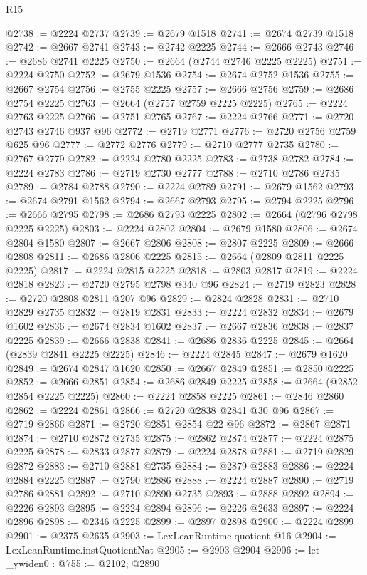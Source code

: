 \begin{lexlean}{R15}
\begin{coremodule}
@2738 := @2224 @2737
@2739 := @2679 @1518
@2741 := @2674 @2739 @1518
@2742 := @2667 @2741
@2743 := @2742 @2225
@2744 := @2666 @2743
@2746 := @2686 @2741 @2225
@2750 := @2664 (@2744 @2746 @2225 @2225)
@2751 := @2224 @2750
@2752 := @2679 @1536
@2754 := @2674 @2752 @1536
@2755 := @2667 @2754
@2756 := @2755 @2225
@2757 := @2666 @2756
@2759 := @2686 @2754 @2225
@2763 := @2664 (@2757 @2759 @2225 @2225)
@2765 := @2224 @2763 @2225
@2766 := @2751 @2765
@2767 := @2224 @2766
@2771 := @2720 @2743 @2746 @937 @96
@2772 := @2719 @2771
@2776 := @2720 @2756 @2759 @625 @96
@2777 := @2772 @2776
@2779 := @2710 @2777 @2735
@2780 := @2767 @2779
@2782 := @2224 @2780 @2225
@2783 := @2738 @2782
@2784 := @2224 @2783
@2786 := @2719 @2730 @2777
@2788 := @2710 @2786 @2735
@2789 := @2784 @2788
@2790 := @2224 @2789
@2791 := @2679 @1562
@2793 := @2674 @2791 @1562
@2794 := @2667 @2793
@2795 := @2794 @2225
@2796 := @2666 @2795
@2798 := @2686 @2793 @2225
@2802 := @2664 (@2796 @2798 @2225 @2225)
@2803 := @2224 @2802
@2804 := @2679 @1580
@2806 := @2674 @2804 @1580
@2807 := @2667 @2806
@2808 := @2807 @2225
@2809 := @2666 @2808
@2811 := @2686 @2806 @2225
@2815 := @2664 (@2809 @2811 @2225 @2225)
@2817 := @2224 @2815 @2225
@2818 := @2803 @2817
@2819 := @2224 @2818
@2823 := @2720 @2795 @2798 @340 @96
@2824 := @2719 @2823
@2828 := @2720 @2808 @2811 @207 @96
@2829 := @2824 @2828
@2831 := @2710 @2829 @2735
@2832 := @2819 @2831
@2833 := @2224 @2832
@2834 := @2679 @1602
@2836 := @2674 @2834 @1602
@2837 := @2667 @2836
@2838 := @2837 @2225
@2839 := @2666 @2838
@2841 := @2686 @2836 @2225
@2845 := @2664 (@2839 @2841 @2225 @2225)
@2846 := @2224 @2845
@2847 := @2679 @1620
@2849 := @2674 @2847 @1620
@2850 := @2667 @2849
@2851 := @2850 @2225
@2852 := @2666 @2851
@2854 := @2686 @2849 @2225
@2858 := @2664 (@2852 @2854 @2225 @2225)
@2860 := @2224 @2858 @2225
@2861 := @2846 @2860
@2862 := @2224 @2861
@2866 := @2720 @2838 @2841 @30 @96
@2867 := @2719 @2866
@2871 := @2720 @2851 @2854 @22 @96
@2872 := @2867 @2871
@2874 := @2710 @2872 @2735
@2875 := @2862 @2874
@2877 := @2224 @2875 @2225
@2878 := @2833 @2877
@2879 := @2224 @2878
@2881 := @2719 @2829 @2872
@2883 := @2710 @2881 @2735
@2884 := @2879 @2883
@2886 := @2224 @2884 @2225
@2887 := @2790 @2886
@2888 := @2224 @2887
@2890 := @2719 @2786 @2881
@2892 := @2710 @2890 @2735
@2893 := @2888 @2892
@2894 := @2226 @2893
@2895 := @2224 @2894
@2896 := @2226 @2633
@2897 := @2224 @2896
@2898 := @2346 @2225
@2899 := @2897 @2898
@2900 := @2224 @2899
@2901 := @2375 @2635
@2903 := LexLeanRuntime.quotient @16
@2904 := LexLeanRuntime.instQuotientNat
@2905 := @2903 @2904
@2906 := let _ywiden0 : @755 := @2102; @2890

\end{coremodule}
\end{lexlean}

